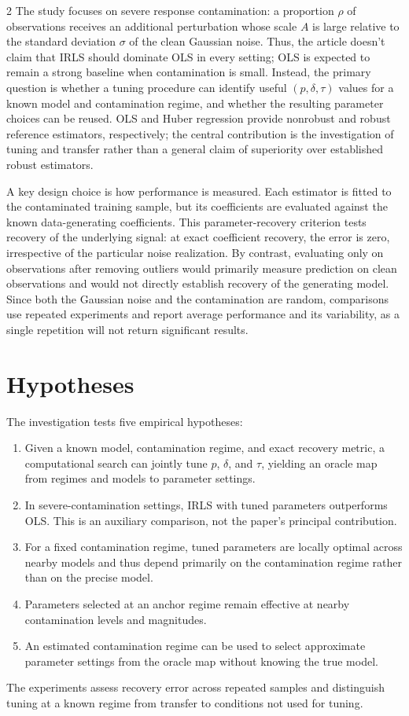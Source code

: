 \documentclass[10pt,a4paper]{article}
\begin{document}
\begin{multicols}{2}
The study focuses on severe response contamination: a proportion $\rho$ of
observations receives an additional perturbation whose scale $A$ is large
relative to the standard deviation $\sigma$ of the clean Gaussian noise.
Thus, the article doesn't claim that IRLS should dominate OLS in every setting;
OLS is expected to remain a strong baseline when contamination is small.
Instead, the primary question is whether a tuning procedure can identify useful
$(p,\delta,\tau)$ values for a known model and contamination regime, and
whether the resulting parameter choices can be reused. OLS and Huber
regression provide nonrobust and robust reference estimators, respectively;
the central contribution is the investigation of tuning and transfer rather
than a general claim of superiority over established robust estimators.

A key design choice is how performance is measured. Each estimator is fitted
to the contaminated training sample, but its coefficients are evaluated
against the known data-generating coefficients. This parameter-recovery
criterion tests recovery of the underlying signal: at exact coefficient
recovery, the error is zero, irrespective of the particular noise realization.
By contrast, evaluating only on observations after removing outliers would
primarily measure prediction on clean observations and would not directly
establish recovery of the generating model. Since both the Gaussian noise and
the contamination are random, comparisons use repeated experiments and
report average performance and its variability, as a single repetition will not
return significant results.

\section{Hypotheses}
\label{sec:hypotheses}

The investigation tests five empirical hypotheses:
\begin{enumerate}[label=\textbf{H\arabic*:}, leftmargin=*]
  \item Given a known model, contamination regime, and exact recovery metric,
  a computational search can jointly tune $p$, $\delta$, and $\tau$, yielding
  an oracle map from regimes and models to parameter settings.
  \item In severe-contamination settings, IRLS with tuned parameters
  outperforms OLS. This is an auxiliary comparison, not the paper's principal
  contribution.
  \item For a fixed contamination regime, tuned parameters are locally
  optimal across nearby models and thus depend primarily on the contamination
  regime rather than on the precise model.
  \item Parameters selected at an anchor regime remain effective at nearby
  contamination levels and magnitudes.
  \item An estimated contamination regime can be used to select approximate
  parameter settings from the oracle map without knowing the true model.
\end{enumerate}
The experiments assess recovery error across repeated samples and distinguish
tuning at a known regime from transfer to conditions not used for tuning.


\end{multicols}
\end{document}
